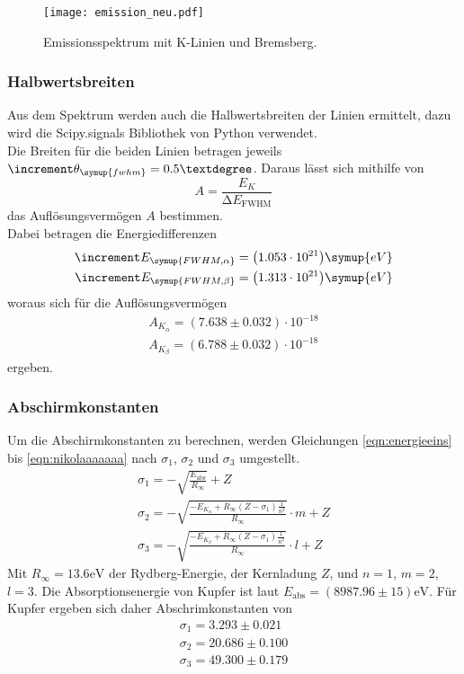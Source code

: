   \begin{figure}
    \centering
    \texttt{[image: emission\_neu.pdf]}
    \caption{Emissionsspektrum mit K-Linien und Bremsberg.}
    \label{fig:emission}
  \end{figure}

  \subsubsection{Halbwertsbreiten}
    Aus dem Spektrum werden auch die Halbwertsbreiten der Linien ermittelt, dazu wird die Scipy.signals Bibliothek von Python 
    verwendet. \\
    Die Breiten für die beiden Linien betragen jeweils $\increment \theta_{\symup{fwhm}} = 0.5 °$. 
    Daraus lässt sich mithilfe von
    \begin{equation*}
      A = \frac{E_K}{\increment E_{\text{FWHM}}}
    \end{equation*}
    das Auflösungsvermögen $A$ bestimmen. \\
    Dabei betragen die Energiedifferenzen
    \begin{align*}
      \increment E_{\symup{FWHM, \alpha}} = \bigl( 1.053 \cdot 10^{21} \bigr) \symup{eV}\\ 
      \increment E_{\symup{FWHM, \beta}} = \bigl( 1.313 \cdot 10^{21} \bigr) \symup{eV}\\
    \end{align*}
    woraus sich für die Auflösungsvermögen
    \begin{align*}
      A_{K_{\alpha}} = (7.638 \pm 0.032) \cdot 10^{-18} \\
      A_{K_{\beta}} = (6.788 \pm 0.032) \cdot 10^{-18}
    \end{align*}
    ergeben.

  \subsubsection{Abschirmkonstanten}
    Um die Abschirmkonstanten zu berechnen, werden Gleichungen \eqref{eqn:energieeins} bis \eqref{eqn:nikolaaaaaaa}
        nach $\sigma_1$, $\sigma_2$ und $\sigma_3$ umgestellt.\\
    \begin{align*}
      \sigma_1 = - \sqrt{\frac{E_{\text{abs}}}{R_{\infty}}} + Z\\
      \sigma_2 = - \sqrt{\frac{- E_{K_{\alpha}} + R_{\infty} (Z - \sigma_1) \frac{1}{n^2}}{R_{\infty}}} \cdot m + Z\\
      \sigma_3 = - \sqrt{\frac{- E_{K_{\beta}} + R_{\infty} (Z - \sigma_1) \frac{1}{n^2}}{R_{\infty}}} \cdot l + Z
    \end{align*}
    Mit $R_{\infty} = 13.6 \text{eV}$ der Rydberg-Energie, der Kernladung $Z$, und $n = 1$, $m = 2$, $l = 3$. 
    Die Absorptionsenergie von Kupfer ist laut \cite{nist} $E_{\text{abs}} = (8987.96 \pm 15) \text{eV}$.
    Für Kupfer ergeben sich daher Abschrimkonstanten von
    \begin{align*}
      \sigma_1 = 3.293 \pm 0.021\\
      \sigma_2 = 20.686 \pm 0.100\\
      \sigma_3 = 49.300 \pm 0.179
    \end{align*}

